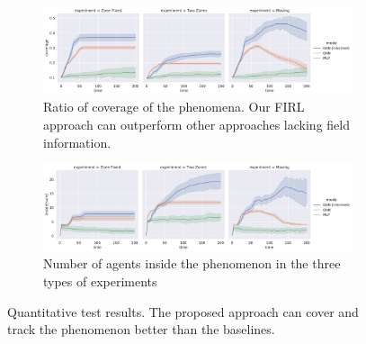 
\begin{figure}
  \centering
  \begin{subfigure}[b]{0.9\linewidth}
    \includegraphics[width=\linewidth]{papers/acsos2023/imgs/coverage-test.pdf}
    \caption[Ratio of coverage of the phenomena in \ac{FIRL}]{Ratio of coverage of the phenomena. Our \ac{FIRL} approach can outperform other approaches lacking field information.}
    \label{fig:coverage-test}
  \end{subfigure}
  \begin{subfigure}[b]{0.9\linewidth}
    \includegraphics[width=\linewidth]{papers/acsos2023/imgs/inside-test}
    \caption{Number of agents inside the phenomenon in the three types of experiments}
    \label{fig:inside-test}
  \end{subfigure}
	\caption[Quantitative test results of \ac{FIRL}]{Quantitative test results.
	 	The proposed approach can cover and track the phenomenon better than the baselines.
	}
	\label{fig:test}
\end{figure}
